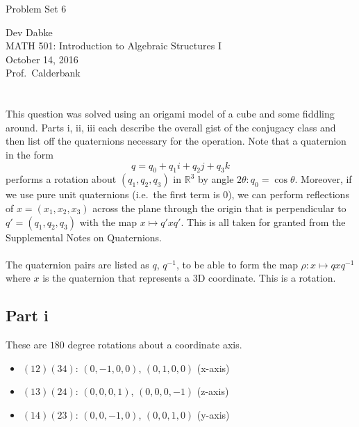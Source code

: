 \documentclass[letterpaper]{article}
\def\name{Problem Set 6}
\begin{document}
{\huge \name}


\vspace{0.25in}

Dev Dabke \\
MATH 501: Introduction to Algebraic Structures I \\
October 14, 2016 \\
Prof.\ Calderbank \\

\section{}
\label{sec:Question1}

This question was solved using an origami model of a cube and some fiddling around.
Parts i, ii, iii each describe the overall gist of the conjugacy class and then list off the quaternions necessary for the operation.
Note that a quaternion in the form
\[
q = q_0 + q_1 i + q_2 j + q_3 k
\]
performs a rotation about $ (q_1, q_2, q_3) $ in $ \mathbb{R}^3 $ by angle $ 2 \theta : q_0 = \cos{\theta} $.
Moreover, if we use pure unit quaternions (i.e.\ the first term is $ 0 $), we can perform reflections of $ x = (x_1, x_2, x_3) $ across the plane through the origin that is perpendicular to $ q' = (q_1, q_2, q_3) $ with the map $ x \mapsto q'xq' $.
This is all taken for granted from the Supplemental Notes on Quaternions.
\\ \\
The quaternion pairs are listed as $ q $, $ q^{-1} $, to be able to form the map $ \rho : x \mapsto qxq^{-1} $ where $ x $ is the quaternion that represents a 3D coordinate.
This is a rotation.

\subsection{Part i}
\label{subs:1Parti}

These are $ 180 $ degree rotations about a coordinate axis.

\begin{itemize}
    \item $ (12)(34) $: $ (0, -1, 0, 0) $, $ (0, 1, 0, 0) $ (x-axis)
    \item $ (13)(24) $: $ (0, 0, 0, 1) $, $ (0, 0, 0, -1) $ (z-axis)
    \item $ (14)(23) $: $ (0, 0, -1, 0) $, $ (0, 0, 1, 0) $ (y-axis)
\end{itemize}
\end{document}
